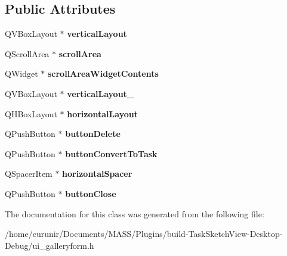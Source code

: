 \subsection*{Public Attributes}
\begin{DoxyCompactItemize}
\item 
Q\+V\+Box\+Layout $\ast$ {\bfseries vertical\+Layout}\hypertarget{class_ui___gallery_form_a6ac0c502209b6ea729863b272c5987cb}{}\label{class_ui___gallery_form_a6ac0c502209b6ea729863b272c5987cb}

\item 
Q\+Scroll\+Area $\ast$ {\bfseries scroll\+Area}\hypertarget{class_ui___gallery_form_a4f584e9b404fbdd67c9f04bba8200dfd}{}\label{class_ui___gallery_form_a4f584e9b404fbdd67c9f04bba8200dfd}

\item 
Q\+Widget $\ast$ {\bfseries scroll\+Area\+Widget\+Contents}\hypertarget{class_ui___gallery_form_a93527569f2367c34315873d239d3c085}{}\label{class_ui___gallery_form_a93527569f2367c34315873d239d3c085}

\item 
Q\+V\+Box\+Layout $\ast$ {\bfseries vertical\+Layout\+\_}\hypertarget{class_ui___gallery_form_a137f0f4675091bd7ab8176f070dffc03}{}\label{class_ui___gallery_form_a137f0f4675091bd7ab8176f070dffc03}

\item 
Q\+H\+Box\+Layout $\ast$ {\bfseries horizontal\+Layout}\hypertarget{class_ui___gallery_form_af1ca9449b9f74c0a840243749968bcdc}{}\label{class_ui___gallery_form_af1ca9449b9f74c0a840243749968bcdc}

\item 
Q\+Push\+Button $\ast$ {\bfseries button\+Delete}\hypertarget{class_ui___gallery_form_a1576fbc1bc5159168eb78e60de0dfd2e}{}\label{class_ui___gallery_form_a1576fbc1bc5159168eb78e60de0dfd2e}

\item 
Q\+Push\+Button $\ast$ {\bfseries button\+Convert\+To\+Task}\hypertarget{class_ui___gallery_form_af8683544b5a8ce3c5b8ec8b425fa66ba}{}\label{class_ui___gallery_form_af8683544b5a8ce3c5b8ec8b425fa66ba}

\item 
Q\+Spacer\+Item $\ast$ {\bfseries horizontal\+Spacer}\hypertarget{class_ui___gallery_form_ad0a0a5a1d7817bba06ed6333c65102e7}{}\label{class_ui___gallery_form_ad0a0a5a1d7817bba06ed6333c65102e7}

\item 
Q\+Push\+Button $\ast$ {\bfseries button\+Close}\hypertarget{class_ui___gallery_form_a1f72183617e8e4074e0a63fe229964d1}{}\label{class_ui___gallery_form_a1f72183617e8e4074e0a63fe229964d1}

\end{DoxyCompactItemize}


The documentation for this class was generated from the following file\+:\begin{DoxyCompactItemize}
\item 
/home/curunir/\+Documents/\+M\+A\+S\+S/\+Plugins/build-\/\+Task\+Sketch\+View-\/\+Desktop-\/\+Debug/ui\+\_\+galleryform.\+h\end{DoxyCompactItemize}
